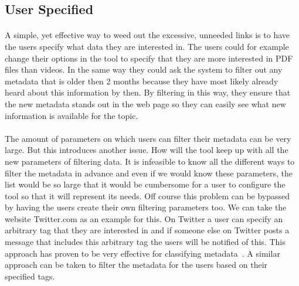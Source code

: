 	\subsection{User Specified} \label{ssub:User specified}
		\paragraph{}
		A simple, yet effective way to weed out the excessive, unneeded links is to have the users specify what data they are interested in. The users could for example change their options in the tool to specify that they are more interested in PDF files than videos. In the same way they could ask the system to filter out any metadata that is older then 2 months because they have most likely already heard about this information by then. By filtering in this way, they ensure that the new metadata stands out in the web page so they can easily see what new information is available for the topic.
		\paragraph{}
		The amount of parameters on which users can filter their metadata can be very large. But this introduces another issue. How will the tool keep up with all the new parameters of filtering data. It is infeasible to know all the different ways to filter the metadata in advance and even if we would know these parameters, the list would be so large that it would be cumbersome for a user to configure the tool so that it will represent its needs. Off course this problem can be bypassed by having the users create their own filtering parameters too. We can take the website Twitter.com as an example for this. On Twitter a user can specify an arbitrary tag that they are interested in and if someone else on Twitter posts a message that includes this arbitrary tag the users will be notified of this. This approach has proven to be very effective for classifying metadata~\cite{macgregor2006collaborative}. A similar approach can be taken to filter the metadata for the users based on their specified tags.
